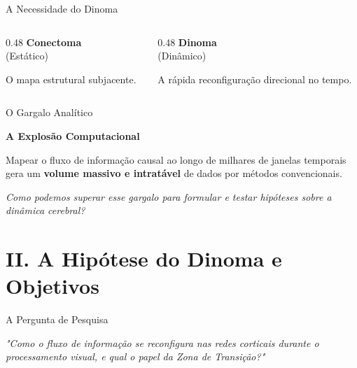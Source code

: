 \documentclass[10pt]{beamer}
\begin{document}
\begin{frame}{A Necessidade do Dinoma}
    \begin{columns}[c]
        \begin{column}{0.48\textwidth}
            \centering
            \Large \textbf{Conectoma} \\
            \normalsize (Estático)
            
            \vspace{0.6cm}
            O mapa estrutural subjacente.
        \end{column}
        \begin{column}{0.48\textwidth}
            \centering
            \Large \textbf{Dinoma} \\
            \normalsize (Dinâmico)
            
            \vspace{0.6cm}
            A rápida reconfiguração direcional no tempo.
        \end{column}
    \end{columns}
\end{frame}

\begin{frame}{O Gargalo Analítico}
    \centering
    \vspace{1cm}
    
    \Large \textbf{A Explosão Computacional}
    
    \vspace{1cm}
    \normalsize
    Mapear o fluxo de informação causal ao longo de milhares de janelas temporais gera um \textbf{volume massivo e intratável} de dados por métodos convencionais.
    
    \vspace{1.5cm}
    \textit{Como podemos superar esse gargalo para formular e testar hipóteses sobre a dinâmica cerebral?}
\end{frame}

\section{II. A Hipótese do Dinoma e Objetivos}

\begin{frame}{A Pergunta de Pesquisa}
    \centering
    \vspace{2cm}
    
    \Large
    \textit{"Como o fluxo de informação se reconfigura nas redes corticais durante o processamento visual, e qual o papel da Zona de Transição?"}
\end{frame}
\end{document}
